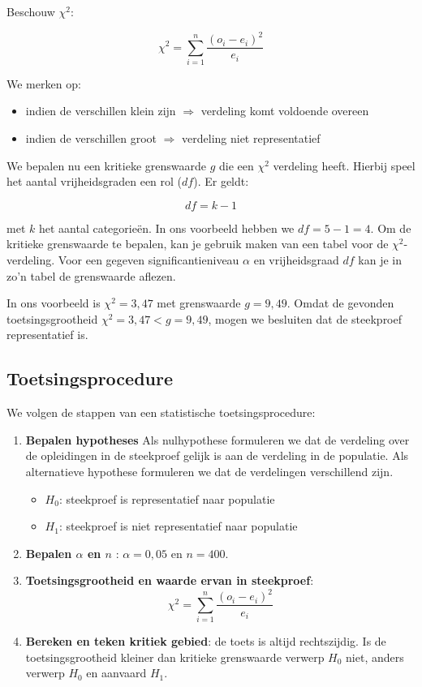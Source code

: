 Beschouw $\chi^{2}$:

\[ \chi^{2} = \sum_{i=1}^{n} \frac{(o_{i} - e_{i})^{2}}{e_{i}} \]

We merken op:
\begin{itemize}
	\item indien de verschillen klein zijn $\Rightarrow$ verdeling komt voldoende overeen
	\item indien de verschillen groot $\Rightarrow$ verdeling niet representatief
\end{itemize}

We bepalen nu een kritieke grenswaarde $g$ die een $\chi^{2}$ verdeling heeft. Hierbij speel het aantal vrijheidsgraden een rol ($df$). Er geldt:

\[ df = k -1 \]

met $k$ het aantal categorie\"en. In ons voorbeeld hebben we $df = 5-1 = 4$. Om de kritieke grenswaarde te bepalen, kan je gebruik maken van een tabel voor de $\chi^2$-verdeling. Voor een gegeven significantieniveau $\alpha$ en vrijheidsgraad $df$ kan je in zo'n tabel de grenswaarde aflezen.

In ons voorbeeld is $\chi^{2} = 3,47$ met grenswaarde $g = 9,49$. Omdat de gevonden toetsingsgrootheid $\chi^2 = 3,47 < g = 9,49$, mogen we besluiten dat de steekproef representatief is.


\subsection{Toetsingsprocedure}
We volgen de stappen van een statistische toetsingsprocedure:

\begin{enumerate}
	\item \textbf{Bepalen hypotheses}
		Als nulhypothese formuleren we dat de verdeling over de opleidingen in de steekproef gelijk is aan de verdeling in de populatie. Als alternatieve hypothese formuleren we dat de verdelingen verschillend zijn.
		\begin{itemize}
			\item $H_{0}$: steekproef is representatief naar populatie
			\item $H_{1}$: steekproef is niet representatief naar populatie
		\end{itemize}
	\item \textbf{Bepalen $\alpha$ en $n$} : $\alpha = 0,05$ en $n = 400$.
	\item \textbf{Toetsingsgrootheid en waarde ervan in steekproef}:
	\[ \chi^{2} = \sum_{i=1}^{n} \frac{(o_{i} - e_{i})^{2}}{e_{i}} \]
	\item \textbf{Bereken en teken kritiek gebied}: de toets is altijd rechtszijdig. Is de toetsingsgrootheid kleiner dan kritieke grenswaarde verwerp $H_{0}$ niet, anders verwerp $H_{0}$ en aanvaard $H_{1}$. 
\end{enumerate}

